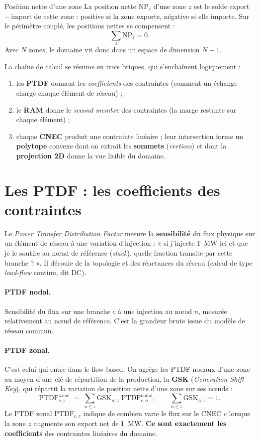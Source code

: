 \documentclass[11pt,a4paper]{article}
\newcommand{\NP}{\mathrm{NP}}
\newcommand{\PTDF}{\mathrm{PTDF}}
\newcommand{\GSK}{\mathrm{GSK}}
\begin{document}
\begin{defbox}{Position nette d'une zone}
La position nette $\NP_z$ d'une zone $z$ est le solde
export\,$-$\,import de cette zone : positive si la zone exporte, négative
si elle importe. Sur le périmètre couplé, les positions nettes se
compensent :
\[
  \sum_{z} \NP_z = 0 .
\]
Avec $N$ zones, le domaine vit donc dans un espace de dimension $N-1$.
\end{defbox}

La chaîne de calcul se résume en trois briques, qui s'enchaînent
logiquement :
\begin{enumerate}[nosep]
  \item les \textbf{PTDF} donnent les \emph{coefficients} des contraintes
        (comment un échange charge chaque élément de réseau) ;
  \item le \textbf{RAM} donne le \emph{second membre} des contraintes
        (la marge restante sur chaque élément) ;
  \item chaque \textbf{CNEC} produit une contrainte linéaire ; leur
        intersection forme un \textbf{polytope} convexe dont on extrait
        les \textbf{sommets} (\textit{vertices}) et dont la
        \textbf{projection 2D} donne la vue lisible du domaine.
\end{enumerate}

\section{Les PTDF : les coefficients des contraintes}
\label{sec:ptdf}

Le \emph{Power Transfer Distribution Factor} mesure la \textbf{sensibilité}
du flux physique sur un élément de réseau à une variation d'injection :
« si j'injecte 1~MW ici et que je le soutire au n\oe{}ud de référence
(\emph{slack}), quelle fraction transite par cette branche ? ». Il découle
de la topologie et des réactances du réseau (calcul de type
\emph{load-flow} continu, dit DC).

\paragraph{PTDF nodal.} Sensibilité du flux sur une branche $c$ à une
injection au n\oe{}ud $n$, mesurée relativement au n\oe{}ud de référence.
C'est la grandeur brute issue du modèle de réseau commun.

\paragraph{PTDF zonal.} C'est celui qui entre dans le flow-based. On agrège
les PTDF nodaux d'une zone au moyen d'une clé de répartition de la
production, la \textbf{GSK} (\emph{Generation Shift Key}), qui répartit la
variation de position nette d'une zone sur ses n\oe{}uds :
\[
  \PTDF^{\text{zonal}}_{c,z}
   \;=\; \sum_{n \in z} \GSK_{n,z}\;\PTDF^{\text{nodal}}_{c,n},
   \qquad \sum_{n\in z}\GSK_{n,z}=1 .
\]
Le PTDF zonal $\PTDF_{c,z}$ indique de combien varie le flux sur le CNEC
$c$ lorsque la zone $z$ augmente son export net de 1~MW. \textbf{Ce sont
exactement les coefficients} des contraintes linéaires du domaine.
\end{document}
